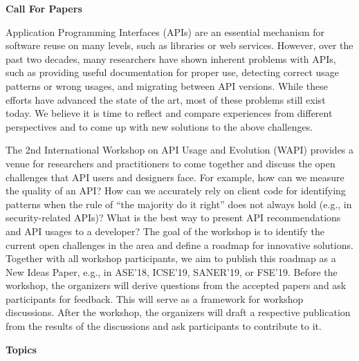 \documentclass[sigconf]{acmart}
\newcommand{\updated}[1]{#1}
\newcommand{\shortname}{WAPI}
\begin{document}
%



\newpage
\onecolumn

\begin{center}
\Large{\textbf{Call For Papers}}
\end{center}

Application Programming Interfaces (APIs) are an essential mechanism for software reuse on many levels, such as libraries or web services. However, over the past two decades, many researchers have shown inherent problems with APIs, such as providing useful documentation for proper use, detecting correct usage patterns or wrong usages, and migrating between API versions. While these efforts have advanced the state of the art, most of these problems still exist today. We believe it is time to reflect and compare experiences from different perspectives and to come up with new solutions to the above challenges. 

The 2nd International Workshop on API Usage and Evolution (\shortname{}) provides a venue for researchers and practitioners to come together and discuss the open challenges that API users and designers face. For example, how can we measure the quality of an API\@? How can we accurately rely on client code for identifying patterns when the rule of ``the majority do it right'' does not always hold (e.g., in security-related APIs)? What is the best way to present API recommendations and API usages to a developer?
%
\updated{The goal of the workshop is to identify the current open challenges in the area and define a roadmap for innovative solutions. Together with all workshop participants, we aim to publish this roadmap as a New Ideas Paper, e.g., in ASE'18, ICSE'19, SANER'19, or FSE'19.
Before the workshop, the organizers will derive questions from the accepted papers and ask participants for feedback. This will serve as a framework for workshop discussions. After the workshop, the organizers will draft a respective publication from the results of the discussions and ask participants to contribute to it.}


\vspace{0.2cm}

\noindent
\textbf{\large Topics}
\vspace{0.2cm}
\end{document}
